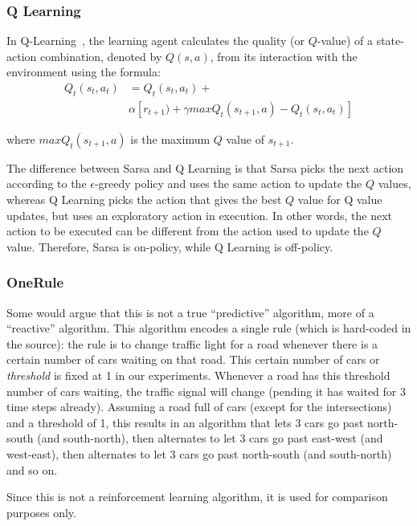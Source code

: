 \subsubsection{Q Learning}

In Q-Learning~\cite{watkins_qlearning_1992}, the learning agent calculates the
quality (or $Q$-value) of a state-action combination, denoted by $Q(s, a)$, from
its interaction with the environment using the formula:
\begin{equation}
\begin{aligned}
Q_t(s_t, a_t) &= Q_t(s_t, a_t) + \\
&\alpha [r_{t+1}) + \gamma max Q_t(s_{t+1}, a) - Q_t(s_t, a_t)]
\end{aligned}
\label{equ:qupdate}
\end{equation}

where $max Q_t(s_{t+1}, a)$ is the maximum $Q$ value of $s_{t+1}$.

The difference between Sarsa and Q Learning is that Sarsa picks the next action
according to the $\epsilon $-greedy policy and uses the same action to update
the $Q$ values, whereas Q Learning picks the action that gives the best $Q$
value for Q value updates, but uses an exploratory action in execution. In other
words, the next action to be executed can be different from the action used to
update the $Q$ value. Therefore, Sarsa is on-policy, while Q Learning is
off-policy.

\subsubsection{OneRule}

Some would argue that this is not a true ``predictive''
algorithm, more of a ``reactive'' algorithm. This algorithm
encodes a single rule (which is hard-coded in the source):
the rule is to change traffic light for a road
whenever there is a certain number of cars
waiting on that road. This certain number
of cars or \emph{threshold} is fixed at 1 in our experiments.
Whenever a road has this threshold number of cars waiting, the traffic
signal will change (pending it has waited for 3 time steps already).
Assuming a road full of cars (except for the intersections) and
a threshold of 1, this results in an algorithm that lets 3 cars go past north-south
(and south-north), then alternates to let 3 cars go past east-west (and
west-east), then alternates to let 3 cars go
past north-south (and south-north) and so on.

Since this is not a reinforcement learning algorithm, it is
used for comparison purposes only.

